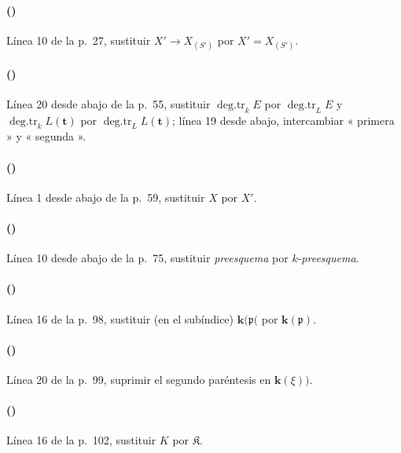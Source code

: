 \paragraph{({\texorpdfstring{\protect{}}{IV, 2.6.1}})}
Línea 10 de la p.~27, sustituir $X'\to X_{(S')}$ por
$X'=X_{(S')}$. 

\paragraph{({\texorpdfstring{\protect{}}{IV, 4.2.1}})}
Línea 20 desde abajo de la p.~55, sustituir
$\operatorname{deg.tr}_kE$ por $\operatorname{deg.tr}_LE$ y
$\operatorname{deg.tr}_kL(\mathbf{t})$ por $\operatorname{deg.tr}_LL(\mathbf{t})$;
línea 19 desde abajo, intercambiar « primera » y « segunda ».

\paragraph{({\texorpdfstring{\protect{}}{IV, 4.4.2}})}
Línea 1 desde abajo de la p.~59, sustituir $X$ por $X'$.

\paragraph{({\texorpdfstring{\protect{}}{IV, 4.7.3}})}
Línea 10 desde abajo de la p.~75, sustituir \emph{preesquema} por $k$-\emph{preesquema}.

\paragraph{({\texorpdfstring{\protect{}}{IV, 5.6.1}})}
Línea 16 de la p.~98, sustituir (en el subíndice) $\boldsymbol{k}(\mathfrak p($ por
$\boldsymbol{k}(\mathfrak p)$.

\paragraph{({\texorpdfstring{\protect{}}{IV, 5.6.5}})}
Línea 20 de la p.~99, suprimir el segundo paréntesis en $\boldsymbol{k}(\xi))$.

\paragraph{({\texorpdfstring{\protect{}}{IV, 5.6.11.1}})}
Línea 16 de la p.~102, sustituir $K$ por $\mathfrak K$.

